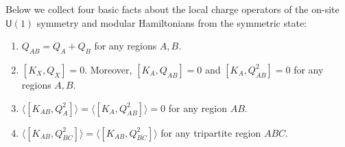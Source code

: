 \documentclass[10pt,a4paper]{amsart}
\def\gU{\textsf{U}}
\begin{document}
\begin{Fact} \label{fact:basic}
    Below we collect four basic facts about the local charge operators of the on-site $\gU(1)$ symmetry and modular Hamiltonians from the symmetric state:  
    \begin{enumerate}
        \item $Q_{AB} = Q_A + Q_B$ for any regions $A,B$.  
        \item $[K_X,Q_X]=0$. Moreover, $[K_A,Q_{AB}] = 0$ and $ [K_{A},Q_{AB}^2] = 0$ for any regions $A,B$. 
        \item $\langle [K_{AB},Q_A^2]\rangle = \langle [K_{A},Q_{AB}^2]\rangle = 0$ for any region $AB$. 
        \item $\langle [K_{AB},Q_{BC}^2] \rangle = \langle [K_{AB},Q_{\overline{BC}}^2] \rangle$ for any tripartite region $ABC$. 
    \end{enumerate}
\end{Fact}
\end{document}
